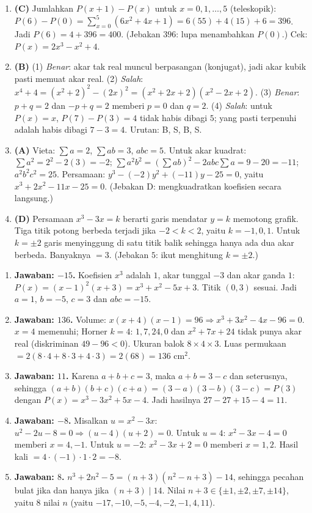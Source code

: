 \documentclass[a4paper,11pt]{article}
\newcounter{no}
\begin{document}
\begin{enumerate}[leftmargin=2em,itemsep=2pt,topsep=2pt]
\item[\textbf{17.}] \textbf{(C)} Jumlahkan $P(x+1)-P(x)$ untuk $x=0,1,\dots,5$ (teleskopik): $P(6)-P(0)=\sum_{x=0}^{5}(6x^2+4x+1)=6(55)+4(15)+6=396$. Jadi $P(6)=4+396=400$. (Jebakan $396$: lupa menambahkan $P(0)$.) Cek: $P(x)=2x^3-x^2+4$.
\item[\textbf{18.}] \textbf{(B)} (1) \emph{Benar}: akar tak real muncul berpasangan (konjugat), jadi akar kubik pasti memuat akar real. (2) \emph{Salah}: $x^4+4=(x^2+2)^2-(2x)^2=(x^2+2x+2)(x^2-2x+2)$. (3) \emph{Benar}: $p+q=2$ dan $-p+q=2$ memberi $p=0$ dan $q=2$. (4) \emph{Salah}: untuk $P(x)=x$, $P(7)-P(3)=4$ tidak habis dibagi $5$; yang pasti terpenuhi adalah habis dibagi $7-3=4$. Urutan: B, S, B, S.
\item[\textbf{19.}] \textbf{(A)} Vieta: $\sum a=2$, $\sum ab=3$, $abc=5$. Untuk akar kuadrat: $\sum a^2=2^2-2(3)=-2$; $\sum a^2b^2=(\sum ab)^2-2abc\sum a=9-20=-11$; $a^2b^2c^2=25$. Persamaan: $y^3-(-2)y^2+(-11)y-25=0$, yaitu $x^3+2x^2-11x-25=0$. (Jebakan D: mengkuadratkan koefisien secara langsung.)
\item[\textbf{20.}] \textbf{(D)} Persamaan $x^3-3x=k$ berarti garis mendatar $y=k$ memotong grafik. Tiga titik potong berbeda terjadi jika $-2<k<2$, yaitu $k=-1,0,1$. Untuk $k=\pm2$ garis menyinggung di satu titik balik sehingga hanya ada dua akar berbeda. Banyaknya $=3$. (Jebakan $5$: ikut menghitung $k=\pm2$.)
\end{enumerate}
\par{}\par\vspace{0.2em}
\small\begin{enumerate}[leftmargin=2em,itemsep=2pt,topsep=2pt]
\item[\textbf{1.}] \textbf{Jawaban: $-15$.} Koefisien $x^3$ adalah $1$, akar tunggal $-3$ dan akar ganda $1$: $P(x)=(x-1)^2(x+3)=x^3+x^2-5x+3$. Titik $(0,3)$ sesuai. Jadi $a=1$, $b=-5$, $c=3$ dan $abc=-15$.
\item[\textbf{2.}] \textbf{Jawaban: $136$.} Volume: $x(x+4)(x-1)=96\Rightarrow x^3+3x^2-4x-96=0$. $x=4$ memenuhi; Horner $k=4$: $1,7,24,0$ dan $x^2+7x+24$ tidak punya akar real (diskriminan $49-96<0$). Ukuran balok $8\times4\times3$. Luas permukaan $=2(8\cdot4+8\cdot3+4\cdot3)=2(68)=136$ cm$^2$.
\item[\textbf{3.}] \textbf{Jawaban: $11$.} Karena $a+b+c=3$, maka $a+b=3-c$ dan seterusnya, sehingga $(a+b)(b+c)(c+a)=(3-a)(3-b)(3-c)=P(3)$ dengan $P(x)=x^3-3x^2+5x-4$. Jadi hasilnya $27-27+15-4=11$.
\item[\textbf{4.}] \textbf{Jawaban: $-8$.} Misalkan $u=x^2-3x$: $u^2-2u-8=0\Rightarrow(u-4)(u+2)=0$. Untuk $u=4$: $x^2-3x-4=0$ memberi $x=4,-1$. Untuk $u=-2$: $x^2-3x+2=0$ memberi $x=1,2$. Hasil kali $=4\cdot(-1)\cdot1\cdot2=-8$.
\item[\textbf{5.}] \textbf{Jawaban: $8$.} $n^3+2n^2-5=(n+3)(n^2-n+3)-14$, sehingga pecahan bulat jika dan hanya jika $(n+3)\mid14$. Nilai $n+3\in\{\pm1,\pm2,\pm7,\pm14\}$, yaitu $8$ nilai $n$ (yaitu $-17,-10,-5,-4,-2,-1,4,11$).
\end{enumerate}
\end{document}

